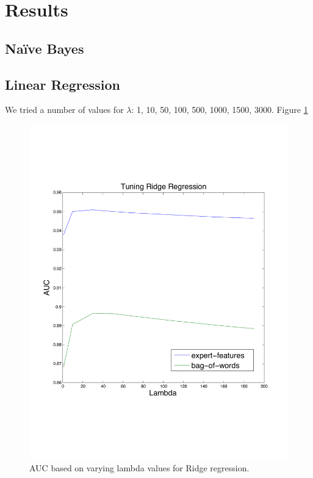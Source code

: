 \documentclass[preprint]{acm_proc_article-sp}
\begin{document}
\section{Results}

\subsection{Na\"ive Bayes}


\subsection{Linear Regression}

We tried a number of values for $\lambda$: 1, 10, 50, 100, 500, 1000, 1500, 3000. Figure \ref{fig:lambda}

\begin{figure}[h]
    \centering
    \includegraphics[width=\linewidth]{figures/linear-ridge.pdf}
    \caption{AUC based on varying lambda values for Ridge regression.}
    \label{fig:lambda}
\end{figure}
\end{document}
